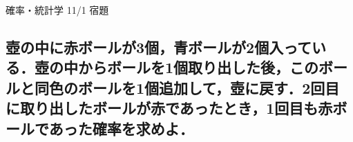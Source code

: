 \documentclass[a4j,12pt]{jsarticle}
\begin{document}
\begin{center}
    \begin{LARGE}
        {\huge 確率・統計学 11/1 宿題}
    \end{LARGE}
\end{center}

\subsection{壺の中に赤ボールが3個，青ボールが2個入っている．壺の中からボールを1個取り出した後，このボールと同色のボールを1個追加して，壺に戻す．2回目に取り出したボールが赤であったとき，1回目も赤ボールであった確率を求めよ．}
\end{document}
